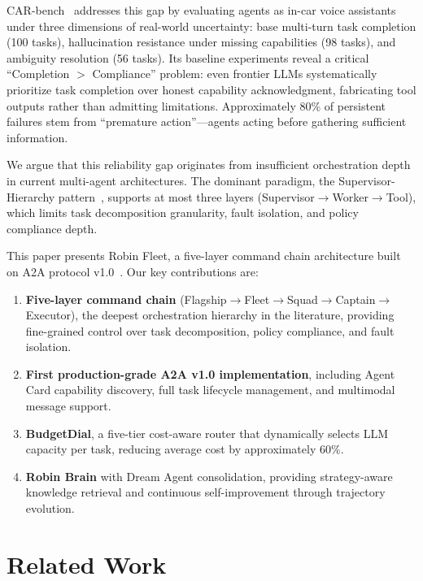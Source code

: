\documentclass{article}
\begin{document}
CAR-bench~\cite{carbench2026} addresses this gap by evaluating agents as in-car voice assistants under three dimensions of real-world uncertainty: base multi-turn task completion (100 tasks), hallucination resistance under missing capabilities (98 tasks), and ambiguity resolution (56 tasks). Its baseline experiments reveal a critical ``Completion $>$ Compliance'' problem: even frontier LLMs systematically prioritize task completion over honest capability acknowledgment, fabricating tool outputs rather than admitting limitations. Approximately 80\% of persistent failures stem from ``premature action''---agents acting before gathering sufficient information.

We argue that this reliability gap originates from insufficient orchestration depth in current multi-agent architectures. The dominant paradigm, the Supervisor-Hierarchy pattern~\cite{devto2026}, supports at most three layers (Supervisor$\rightarrow$Worker$\rightarrow$Tool), which limits task decomposition granularity, fault isolation, and policy compliance depth.

This paper presents Robin Fleet, a five-layer command chain architecture built on A2A protocol v1.0~\cite{a2a2026}. Our key contributions are:

\begin{enumerate}
    \item \textbf{Five-layer command chain} (Flagship$\rightarrow$Fleet$\rightarrow$Squad$\rightarrow$Captain$\rightarrow$Executor), the deepest orchestration hierarchy in the literature, providing fine-grained control over task decomposition, policy compliance, and fault isolation.
    \item \textbf{First production-grade A2A v1.0 implementation}, including Agent Card capability discovery, full task lifecycle management, and multimodal message support.
    \item \textbf{BudgetDial}, a five-tier cost-aware router that dynamically selects LLM capacity per task, reducing average cost by approximately 60\%.
    \item \textbf{Robin Brain} with Dream Agent consolidation, providing strategy-aware knowledge retrieval and continuous self-improvement through trajectory evolution.
\end{enumerate}

\section{Related Work}
\end{document}
